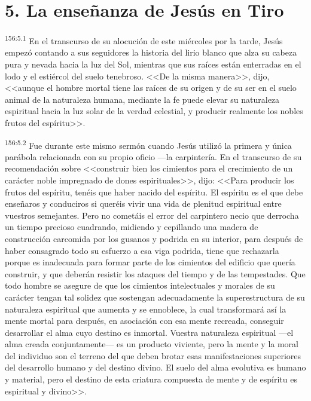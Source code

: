 \section*{5. La enseñanza de Jesús en Tiro}
\par 
\textsuperscript{156:5.1} En el transcurso de su alocución de este miércoles por la tarde, Jesús empezó contando a sus seguidores la historia del lirio blanco que alza su cabeza pura y nevada hacia la luz del Sol, mientras que sus raíces están enterradas en el lodo y el estiércol del suelo tenebroso. <<De la misma manera>>, dijo, <<aunque el hombre mortal tiene las raíces de su origen y de su ser en el suelo animal de la naturaleza humana, mediante la fe puede elevar su naturaleza espiritual hacia la luz solar de la verdad celestial, y producir realmente los nobles frutos del espíritu>>.

\par 
\textsuperscript{156:5.2} Fue durante este mismo sermón cuando Jesús utilizó la primera y única parábola relacionada con su propio oficio ---la carpintería. En el transcurso de su recomendación sobre <<construir bien los cimientos para el crecimiento de un carácter noble impregnado de dones espirituales>>, dijo: <<Para producir los frutos del espíritu, tenéis que haber nacido del espíritu. El espíritu es el que debe enseñaros y conduciros si queréis vivir una vida de plenitud espiritual entre vuestros semejantes. Pero no cometáis el error del carpintero necio que derrocha un tiempo precioso cuadrando, midiendo y cepillando una madera de construcción carcomida por los gusanos y podrida en su interior, para después de haber consagrado todo su esfuerzo a esa viga podrida, tiene que rechazarla porque es inadecuada para formar parte de los cimientos del edificio que quería construir, y que deberán resistir los ataques del tiempo y de las tempestades. Que todo hombre se asegure de que los cimientos intelectuales y morales de su carácter tengan tal solidez que sostengan adecuadamente la superestructura de su naturaleza espiritual que aumenta y se ennoblece, la cual transformará así la mente mortal para después, en asociación con esa mente recreada, conseguir desarrollar el alma cuyo destino es inmortal. Vuestra naturaleza espiritual ---el alma creada conjuntamente--- es un producto viviente, pero la mente y la moral del individuo son el terreno del que deben brotar esas manifestaciones superiores del desarrollo humano y del destino divino. El suelo del alma evolutiva es humano y material, pero el destino de esta criatura compuesta de mente y de espíritu es espiritual y divino>>.

